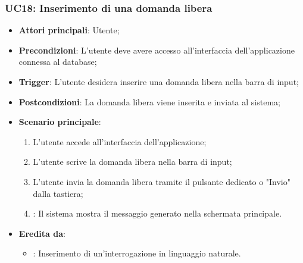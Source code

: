 \subsubsection{UC18: Inserimento di una domanda libera}
\begin{itemize}
    \item \textbf{Attori principali}: Utente;
    \item \textbf{Precondizioni}: L'utente deve avere accesso all'interfaccia dell'applicazione connessa al database;
    \item \textbf{Trigger}: L'utente desidera inserire una domanda libera nella barra di input;
    \item \textbf{Postcondizioni}: La domanda libera viene inserita e inviata al sistema;
    \item \textbf{Scenario principale}:
    \begin{enumerate}
        \item L'utente accede all'interfaccia dell'applicazione;
        \item L'utente scrive la domanda libera nella barra di input;
        \item L'utente invia la domanda libera tramite il pulsante dedicato o "Invio" dalla tastiera;
        \item {}: Il sistema mostra il messaggio generato nella schermata principale.
    \end{enumerate}
    \item \textbf{Eredita da}:
    \begin{itemize}
        \item {}: Inserimento di un'interrogazione in linguaggio naturale.
    \end{itemize}
\end{itemize}

\hypertarget{UC19}{}
